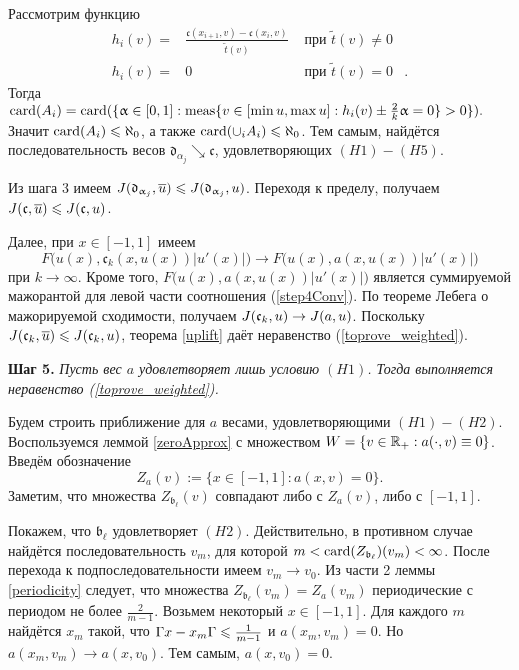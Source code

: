 Рассмотрим функцию
$$
\begin{aligned}
h_i(v) = & \frac{\mathfrak c(x_{i + 1}, v) - \mathfrak c(x_i, v)}{\tilde{t} (v)} & \text{ при } \tilde{t} (v) \neq 0 & \\
h_i(v) = & 0 & \text{ при } \tilde{t} (v) = 0 &.
\end{aligned}
$$
Тогда $\card(A_i) = \card(\{ \alpha \in [0, 1]: \meas \{ v \in [\min u, \max u]: h_i(v) \pm \frac{2}{k} \alpha = 0 \} > 0 \}).$
Значит $\operatorname{card}(A_i) \leqslant \aleph_0$, а также $\operatorname{card}(\cup_i A_i) \leqslant \aleph_0$.
Тем самым, найдётся последовательность весов $\mathfrak d_{\alpha_j} \searrow \mathfrak c$, удовлетворяющих $(H1)-(H5)$.

Из шага 3 имеем $\IWg(\mathfrak d_{\alpha_j}, \mon{u}) \le \IWg(\mathfrak d_{\alpha_j}, u)$.
Переходя к пределу, получаем $\IWg(\mathfrak c, \mon{u}) \le \IWg(\mathfrak c, u)$.

Далее, при $x \in [-1, 1]$ имеем
\begin{equation}
\label{step4Conv}
F \bigl( u(x), \mathfrak c_k(x, u(x)) |u'(x)| \bigr) \to F \bigl( u(x), a(x, u(x)) |u'(x)| \bigr)
\end{equation}
при $k \to \infty$.
Кроме того, $F \bigl( u(x), a(x, u(x)) |u'(x)| \bigr)$ является суммируемой мажорантой для левой части соотношения (\ref{step4Conv}).
По теореме Лебега о мажорируемой сходимости, получаем $J(\mathfrak c_k, u) \to J(a, u)$.
Поскольку $\IWg(\mathfrak c_k, \mon{u}) \le \IWg(\mathfrak c_k, u)$, теорема \ref{uplift} даёт неравенство (\ref{toprove_weighted}).

\bigskip
\textbf{Шаг 5.}
\textit{Пусть вес $a$ удовлетворяет лишь условию $(H1)$.
Тогда выполняется неравенство (\ref{toprove_weighted}).}

Будем строить приближение для $a$ весами, удовлетворяющими $(H1)-(H2)$.
Воспользуемся леммой \ref{zeroApprox} с множеством $W = \{ v \in \mathbb R_+: a(\cdot, v) \equiv 0 \}$.
Введём обозначение
$$
Z_a(v) := \{ x \in [-1, 1]: a(x, v) = 0 \}.
$$
Заметим, что множества $Z_{\mathfrak b_{\ell}}(v)$ совпадают либо с $Z_{a}(v)$, либо с $[-1, 1]$.

Покажем, что  $\mathfrak b_{\ell}$ удовлетворяет $(H2)$.
Действительно, в противном случае найдётся последовательность $v_m$, для которой
$m < \operatorname{card}(Z_{\mathfrak b_{\ell}})(v_m) < \infty$.
После перехода к подпоследовательности имеем $v_m \to v_0$.
Из части 2 леммы \ref{periodicity} следует,
что множества $Z_{\mathfrak b_{\ell}}(v_m) = Z_{a}(v_m)$ периодические с периодом не более $\frac{2}{m - 1}$.
Возьмем некоторый $x \in [-1, 1]$.
Для каждого $m$ найдётся $x_m$ такой, что
$\abs{x - x_m} \le \frac{1}{m - 1}$ и $a(x_m, v_m) = 0$.
Но $a(x_m, v_m) \to a(x, v_0)$.
Тем самым, $a(x, v_0) = 0$.

